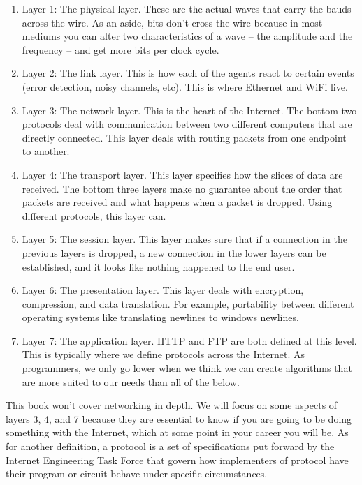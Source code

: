 \begin{enumerate}
\item Layer 1: The physical layer.
  These are the actual waves that carry the bauds across the wire.
  As an aside, bits don't cross the wire because in most mediums you can alter two characteristics of a wave -- the amplitude and the frequency -- and get more bits per clock cycle.

\item Layer 2: The link layer.
  This is how each of the agents react to certain events (error detection, noisy channels, etc).
  This is where \gls{Ethernet} and \gls{WiFi} live.

\item Layer 3: The network layer.
  This is the heart of the Internet.
  The bottom two protocols deal with communication between two different computers that are directly connected.
  This layer deals with routing packets from one endpoint to another.

\item Layer 4: The transport layer.
  This layer specifies how the slices of data are received.
  The bottom three layers make no guarantee about the order that packets are received and what happens when a packet is dropped.
  Using different protocols, this layer can.

\item Layer 5: The session layer.
  This layer makes sure that if a connection in the previous layers is dropped, a new connection in the lower layers can be established, and it looks like nothing happened to the end user.

\item Layer 6: The presentation layer.
  This layer deals with encryption, compression, and data translation.
  For example, portability between different operating systems like translating newlines to windows newlines.

\item Layer 7: The application layer.
  \gls{HTTP} and \gls{FTP} are both defined at this level.
  This is typically where we define protocols across the Internet.
  As programmers, we only go lower when we think we can create algorithms that are more suited to our needs than all of the below.

\end{enumerate}

This book won't cover networking in depth.
We will focus on some aspects of layers 3, 4, and 7 because they are essential to know if you are going to be doing something with the Internet, which at some point in your career you will be.
As for another definition, a protocol is a set of specifications put forward by the \gls{Internet Engineering Task Force} that govern how implementers of protocol have their program or circuit behave under specific circumstances.

